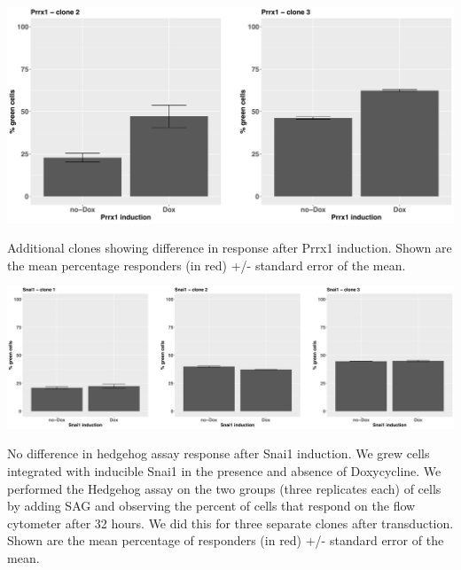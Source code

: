 \begin{suppfigure}[p]  
    \centering
    \includegraphics[width=\linewidth]{figures/hedgehog/SuppFigure17.png}
    \caption[No difference in percent green for Prrx1 induction followed by SAG treatment - Clones 2, 3]{
        Additional clones showing difference in response after Prrx1 induction. Shown are the mean percentage responders (in red) +/- standard error of the mean.  
    }
    \label{fig:hh_figureS17}
\end{suppfigure}


\begin{suppfigure}[p]  
    \centering
    \includegraphics[width=\linewidth]{figures/hedgehog/SuppFigure18.png}
    \caption[No difference in percent green for Snai1 induction followed by SAG treatment]{
        No difference in hedgehog assay response after Snai1 induction. We grew cells integrated with inducible Snai1 in the presence and absence of Doxycycline. We performed the Hedgehog assay on the two groups (three replicates each) of cells by adding SAG and observing the percent of cells that respond on the flow cytometer after 32 hours. We did this for three separate clones after transduction. Shown are the mean percentage of responders (in red) +/- standard error of the mean.
    }
    \label{fig:hh_figureS18}
\end{suppfigure}


